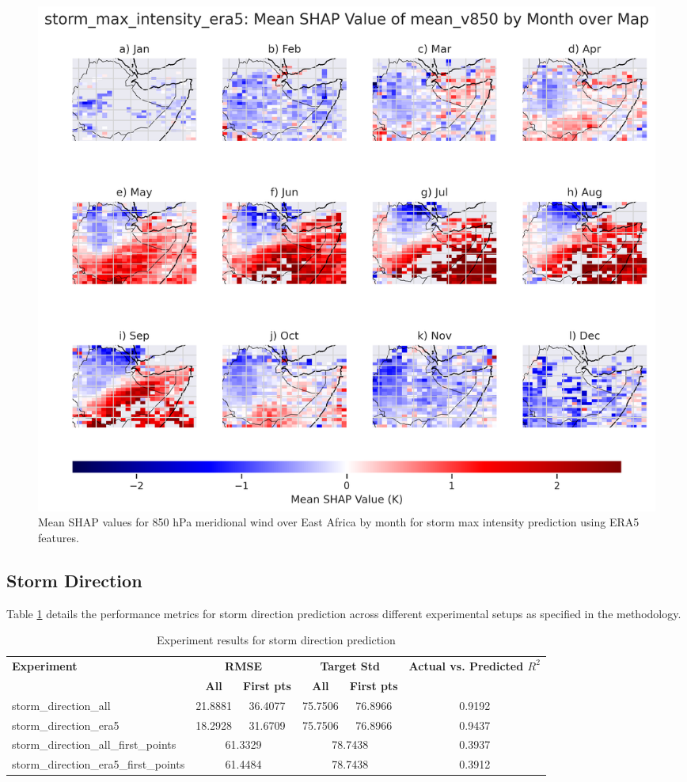 \begin{figure}[h]
    \centering
    \includegraphics[width=\textwidth]{../figures/generated/experiments/storm_max_intensity/geographic_corr/storm_max_intensity_era5_shap_mean_v850_map_by_month.png}
    \caption{Mean SHAP values for 850 hPa meridional wind over East Africa by month for storm max intensity prediction using ERA5 features.}
    \label{fig:storm_max_intensity_era5_shap_mean_v850_map_by_month}
\end{figure}

\subsection{Storm Direction}

Table \ref{tab:storm_direction_results} details the performance metrics for storm direction prediction across different experimental setups as specified in the methodology.

\begin{table}[ht]
\centering
\caption{Experiment results for storm direction prediction}
\label{tab:storm_direction_results}
\begin{tabular}{lccccc}
\hline
\textbf{Experiment} & \multicolumn{2}{c}{\textbf{RMSE}} & \multicolumn{2}{c}{\textbf{Target Std}} & \textbf{Actual vs. Predicted $R^2$} \\
\cline{2-5}
 & \textbf{All} & \textbf{First pts} & \textbf{All} & \textbf{First pts} &  \\
\hline
storm\_direction\_all              & 21.8881 & 36.4077 & 75.7506 & 76.8966 & 0.9192 \\
storm\_direction\_era5             & 18.2928 & 31.6709 & 75.7506 & 76.8966 & 0.9437 \\
storm\_direction\_all\_first\_points & \multicolumn{2}{c}{61.3329} & \multicolumn{2}{c}{78.7438} & 0.3937 \\
storm\_direction\_era5\_first\_points & \multicolumn{2}{c}{61.4484} & \multicolumn{2}{c}{78.7438} & 0.3912 \\
\hline
\end{tabular}
\end{table}


